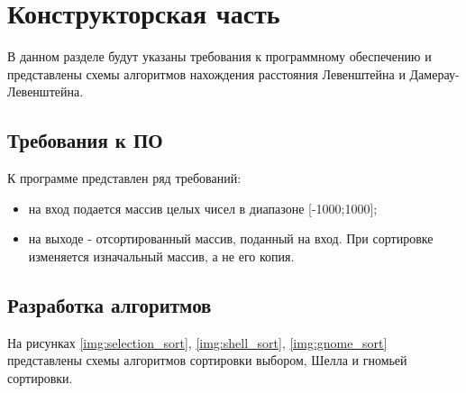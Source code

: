 \chapter{Конструкторская часть}

В данном разделе будут указаны требования к программному обеспечению и представлены схемы алгоритмов нахождения расстояния Левенштейна и Дамерау-Левенштейна.

\section{Требования к ПО}

К программе представлен ряд требований:

\begin{itemize}
	\item на вход подается массив целых чисел в диапазоне [-1000;1000];
	\item на выходе - отсортированный массив, поданный на вход. При сортировке изменяется изначальный массив, а не его копия.
\end{itemize}

\section{Разработка алгоритмов}

На рисунках \ref{img:selection_sort}, \ref{img:shell_sort}, \ref{img:gnome_sort} представлены схемы алгоритмов сортировки выбором, Шелла и гномьей сортировки.

